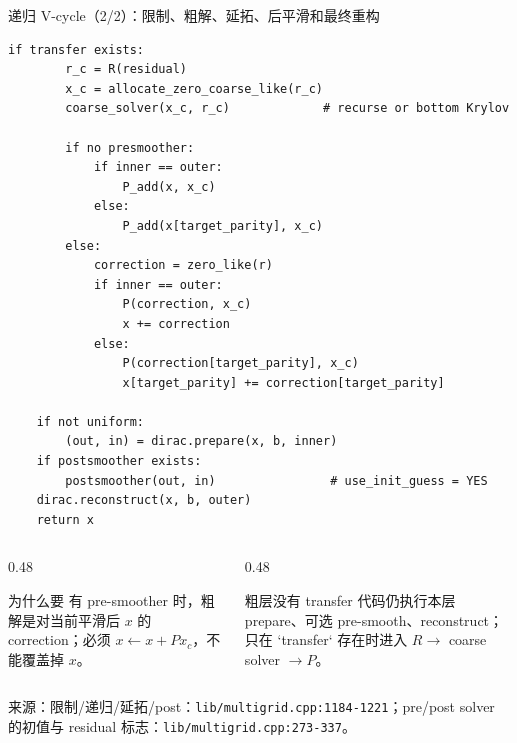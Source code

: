 \documentclass[UTF8,aspectratio=169,11pt]{ctexbeamer}
\newcommand{\source}[1]{\vspace{0.05em}\par{\raggedright\scriptsize\color{muted}来源：#1\par}}
\newcommand{\codepath}[1]{\nolinkurl{#1}}
\begin{document}
\begin{frame}[fragile,t]{递归 V-cycle（2/2）：限制、粗解、延拓、后平滑和最终重构}
  \begin{lstlisting}[firstnumber=1]
    if transfer exists:
        r_c = R(residual)
        x_c = allocate_zero_coarse_like(r_c)
        coarse_solver(x_c, r_c)             # recurse or bottom Krylov

        if no presmoother:
            if inner == outer:
                P_add(x, x_c)
            else:
                P_add(x[target_parity], x_c)
        else:
            correction = zero_like(r)
            if inner == outer:
                P(correction, x_c)
                x += correction
            else:
                P(correction[target_parity], x_c)
                x[target_parity] += correction[target_parity]

    if not uniform:
        (out, in) = dirac.prepare(x, b, inner)
    if postsmoother exists:
        postsmoother(out, in)                # use_init_guess = YES
    dirac.reconstruct(x, b, outer)
    return x
  \end{lstlisting}
  \vspace{0.06cm}
  \begin{columns}[T,totalwidth=\textwidth]
    \begin{column}{0.48\textwidth}
      \begin{block}{为什么要 \texttt{}}
        有 pre-smoother 时，粗解是对当前平滑后 \(x\) 的 correction；必须 \(x\leftarrow x+P x_c\)，不能覆盖掉 \(x\)。
      \end{block}
    \end{column}
    \begin{column}{0.48\textwidth}
      \begin{alertblock}{粗层没有 transfer}
        代码仍执行本层 prepare、可选 pre-smooth、reconstruct；只在 `transfer` 存在时进入 \(R\to\) coarse solver \(\to P\)。
      \end{alertblock}
    \end{column}
  \end{columns}
  \source{限制/递归/延拓/post：\codepath{lib/multigrid.cpp:1184-1221}；pre/post solver 的初值与 residual 标志：\codepath{lib/multigrid.cpp:273-337}。}
\end{frame}
\end{document}
